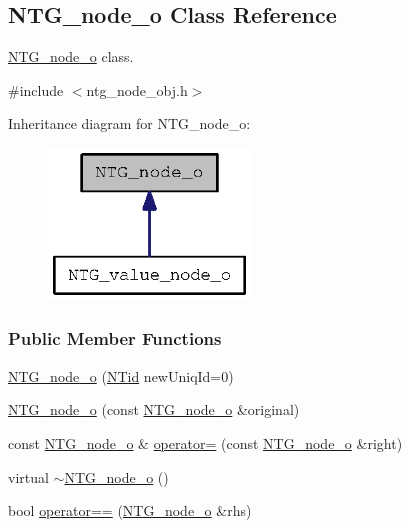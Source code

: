 \subsection{NTG\_\-node\_\-o Class Reference}
\label{class_n_t_g__node__o}


\hyperlink{class_n_t_g__node__o}{NTG\_\-node\_\-o} class.  




{\ttfamily \#include $<$ntg\_\-node\_\-obj.h$>$}



Inheritance diagram for NTG\_\-node\_\-o:
\nopagebreak
\begin{figure}[H]
\begin{center}
\leavevmode
\includegraphics[width=152pt]{class_n_t_g__node__o__inherit__graph}
\end{center}
\end{figure}
\subsubsection*{Public Member Functions}
\begin{DoxyCompactItemize}
\item 
\hyperlink{class_n_t_g__node__o_ab79af83e757149ca65f3629834c91a37}{NTG\_\-node\_\-o} (\hyperlink{nt__types_8h_ab5cab5f78fdd2211c340cbe527a4afd7}{NTid} newUniqId=0)
\item 
\hyperlink{class_n_t_g__node__o_abac4119ffb4c3249a4360608b4030c33}{NTG\_\-node\_\-o} (const \hyperlink{class_n_t_g__node__o}{NTG\_\-node\_\-o} \&original)
\item 
const \hyperlink{class_n_t_g__node__o}{NTG\_\-node\_\-o} \& \hyperlink{class_n_t_g__node__o_a0b1a8ee4546926379578999004da0266}{operator=} (const \hyperlink{class_n_t_g__node__o}{NTG\_\-node\_\-o} \&right)
\item 
virtual \hyperlink{class_n_t_g__node__o_a187a648765073137b77a1ee408bec127}{$\sim$NTG\_\-node\_\-o} ()
\item 
bool \hyperlink{class_n_t_g__node__o_a429e1799bd19ac5cca50dc1a74721b16}{operator==} (\hyperlink{class_n_t_g__node__o}{NTG\_\-node\_\-o} \&rhs)
\end{DoxyCompactItemize}


